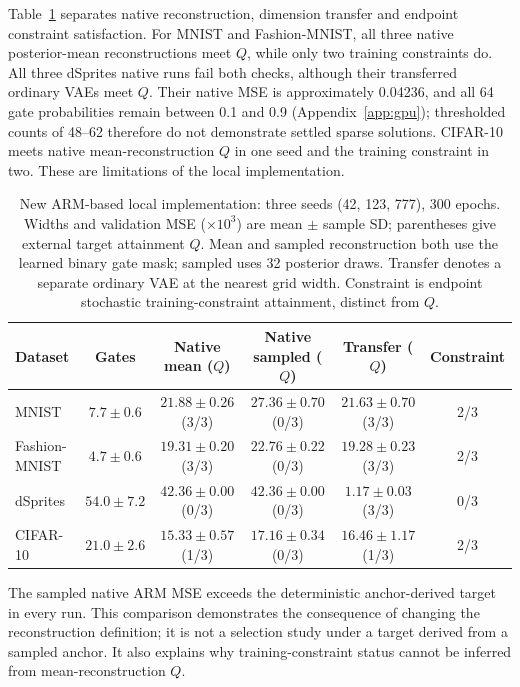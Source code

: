 \documentclass[make,article,submit,pdftex,moreauthors]{Definitions/mdpi}
\begin{document}
Table~\ref{tab:armnew} separates native reconstruction, dimension transfer
and endpoint constraint satisfaction. For MNIST and Fashion-MNIST,
all three native posterior-mean reconstructions meet $Q$, while only
two training constraints do. All three dSprites native runs fail both
checks, although their transferred ordinary VAEs meet $Q$. Their native
MSE is approximately 0.04236, and all 64 gate probabilities remain
between 0.1 and 0.9 (Appendix~\ref{app:gpu}); thresholded counts of 48--62
therefore do not demonstrate settled sparse solutions. CIFAR-10 meets
native mean-reconstruction $Q$ in one seed and the training constraint
in two. These are limitations of the local implementation.
\begin{table}[H]
\caption{New ARM-based local implementation: three seeds (42, 123, 777), 300 epochs. Widths and validation MSE ($\times10^3$) are mean $\pm$ sample SD; parentheses give external target attainment $Q$. Mean and sampled reconstruction both use the learned binary gate mask; sampled uses 32 posterior draws. Transfer denotes a separate ordinary VAE at the nearest grid width. Constraint is endpoint stochastic training-constraint attainment, distinct from $Q$.}\label{tab:armnew}
\footnotesize
\setlength{\tabcolsep}{3pt}
\begin{tabular*}{\textwidth}{@{\extracolsep{\fill}}lccccc@{}}
\toprule
Dataset & Gates & Native mean ($Q$) & Native sampled ($Q$) & Transfer ($Q$) & Constraint \\
\midrule
MNIST & $7.7 \pm 0.6$ & $21.88 \pm 0.26$ (3/3) & $27.36 \pm 0.70$ (0/3) & $21.63 \pm 0.70$ (3/3) & 2/3 \\
Fashion-MNIST & $4.7 \pm 0.6$ & $19.31 \pm 0.20$ (3/3) & $22.76 \pm 0.22$ (0/3) & $19.28 \pm 0.23$ (3/3) & 2/3 \\
dSprites & $54.0 \pm 7.2$ & $42.36 \pm 0.00$ (0/3) & $42.36 \pm 0.00$ (0/3) & $1.17 \pm 0.03$ (3/3) & 0/3 \\
CIFAR-10 & $21.0 \pm 2.6$ & $15.33 \pm 0.57$ (1/3) & $17.16 \pm 0.34$ (0/3) & $16.46 \pm 1.17$ (1/3) & 2/3 \\
\bottomrule\end{tabular*}
\end{table}


The sampled native ARM MSE exceeds the deterministic anchor-derived
target in every run. This comparison demonstrates the consequence of
changing the reconstruction definition; it is not a selection study
under a target derived from a sampled anchor. It also explains why
training-constraint status cannot be inferred from mean-reconstruction $Q$.
\end{document}
